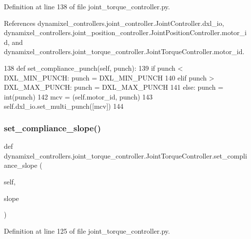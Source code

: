 Definition at line 138 of file joint\+\_\+torque\+\_\+controller.\+py.



References dynamixel\+\_\+controllers.\+joint\+\_\+controller.\+Joint\+Controller.\+dxl\+\_\+io, dynamixel\+\_\+controllers.\+joint\+\_\+position\+\_\+controller.\+Joint\+Position\+Controller.\+motor\+\_\+id, and dynamixel\+\_\+controllers.\+joint\+\_\+torque\+\_\+controller.\+Joint\+Torque\+Controller.\+motor\+\_\+id.


\begin{DoxyCode}
138     \textcolor{keyword}{def }set\_compliance\_punch(self, punch):
139         \textcolor{keywordflow}{if} punch < DXL\_MIN\_PUNCH: punch = DXL\_MIN\_PUNCH
140         \textcolor{keywordflow}{elif} punch > DXL\_MAX\_PUNCH: punch = DXL\_MAX\_PUNCH
141         \textcolor{keywordflow}{else}: punch = int(punch)
142         mcv = (self.motor\_id, punch)
143         self.dxl\_io.set\_multi\_punch([mcv])
144 
\end{DoxyCode}
\mbox{\label{classdynamixel__controllers_1_1joint__torque__controller_1_1_joint_torque_controller_a1ec30f51c9c3409a24232af3c50d8fe2}} 
\subsubsection{\texorpdfstring{set\+\_\+compliance\+\_\+slope()}{set\_compliance\_slope()}}
{\footnotesize\ttfamily def dynamixel\+\_\+controllers.\+joint\+\_\+torque\+\_\+controller.\+Joint\+Torque\+Controller.\+set\+\_\+compliance\+\_\+slope (\begin{DoxyParamCaption}\item[{}]{self,  }\item[{}]{slope }\end{DoxyParamCaption})}



Definition at line 125 of file joint\+\_\+torque\+\_\+controller.\+py.



